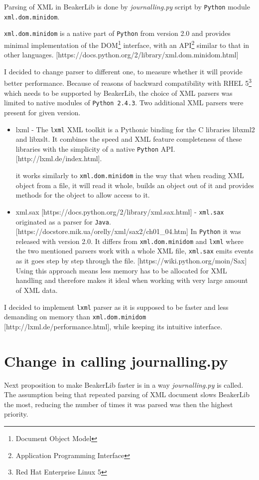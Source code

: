 Parsing of XML in BeakerLib is done by \textit{journalling.py} script by \texttt{Python} module \texttt{xml.dom.minidom}. 

 \texttt{xml.dom.minidom} is a native part of \texttt{Python} from version 2.0 and provides minimal implementation of the DOM\footnote{Document Object Model} interface, with an API\footnote{Application Programming Interface} similar to that in other languages. [https://docs.python.org/2/library/xml.dom.minidom.html]

I decided to change parser to different one, to measure whether it will provide better performance. Because of reasons of backward compatibility with RHEL 5\footnote{Red Hat Enterprise Linux 5} which needs to be supported by BeakerLib, the choice of XML parsers was limited to native modules of \texttt{Python 2.4.3}. Two additional XML parsers were present for given version.

\begin{itemize}
\item lxml - The \texttt{lxml} XML toolkit is a Pythonic binding for the C libraries libxml2 and libxslt. It combines the speed and XML feature completeness of these libraries with the simplicity of a native \texttt{Python} API.  [http://lxml.de/index.html].

it works similarly to \texttt{xml.dom.minidom} in the way that when reading XML object from a file, it will read it whole, builds an object out of it and provides methods for the object to allow access to it.
\item xml.sax  [https://docs.python.org/2/library/xml.sax.html] - \texttt{xml.sax} originated as a parser for \texttt{Java}.  [https://docstore.mik.ua/orelly/xml/sax2/ch01\_04.htm] In \texttt{Python} it was released with version 2.0. It differs from \texttt{xml.dom.minidom} and \texttt{lxml} where the two mentioned parsers work with a whole XML file,  \texttt{xml.sax} emits events as it goes step by step through the file. [https://wiki.python.org/moin/Sax] Using this approach means less memory has to be allocated for XML handling and therefore makes it ideal when working with very large amount of XML  data.
\end{itemize}

I decided to implement \texttt{lxml} parser as it is supposed to be faster and less demanding on memory than \texttt{xml.dom.minidom} [http://lxml.de/performance.html], while keeping its intuitive interface.

\section{Change in calling journalling.py}
Next proposition to make BeakerLib faster is in a way \textit{journalling.py} is called. The assumption being that repeated parsing of XML document slows BeakerLib the most, reducing the number of times it was parsed was then the highest priority. 

